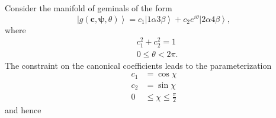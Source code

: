 \documentclass[aps,preprint]{revtex4}%
\begin{document}
Consider the manifold of geminals of the form
\begin{equation}
\left\vert g\left(  \bm{c,\psi,}\theta\right)  \right\rangle =c_{1}\left\vert
1\alpha3\beta\right\rangle +c_{2}e^{i\theta}\left\vert 2\alpha4\beta
\right\rangle ,
\end{equation}
where
\begin{align}
&  c_{1}^{2}+c_{2}^{2}=1\nonumber\\
&  0\leq\theta<2\pi.
\end{align}
The constraint on the canonical coefficients leads to the parameterization
\begin{align}
c_{1}  &  =\cos\chi\nonumber\\
c_{2}  &  =\sin\chi\nonumber\\
0  &  \leq\chi\leq\frac{\pi}{2}%
\end{align}
and hence%
\end{document}
